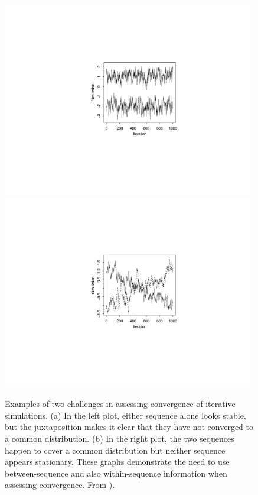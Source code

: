 \documentclass[american,]{article}
\begin{document}
\begin{figure}
\vspace{-.22\textwidth}
\centerline{\hspace{-.1\textwidth}
\includegraphics[width=0.98\textwidth]{graphics/convergechallenge1.pdf}
\hspace{-.5\textwidth}
\includegraphics[width=0.98\textwidth]{graphics/convergechallenge2.pdf}}
\vspace{-.22\textwidth}
\caption{ Examples of two challenges in assessing convergence of iterative
simulations. (a) In the left plot, either sequence alone looks stable, but the
juxtaposition makes it clear that they have not converged to a common
distribution. (b) In the right plot, the two sequences happen to cover a common
distribution but neither sequence appears stationary. These graphs demonstrate
the need to use between-sequence and also within-sequence information when
assessing convergence. From \citet{BDA3}).}
\label{converge.challenge}
\end{figure}
\end{document}

